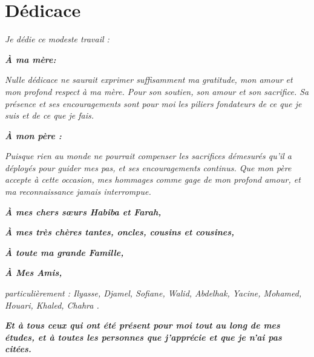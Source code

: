  \chapter*{Dédicace}
\begin{center}
	\textit{  Je dédie ce modeste travail :}
\end{center}
  \begin{center}
  	\textit{\textbf{ À ma mère:} }
  \end{center}
 \begin{center}
 	\textit{ Nulle dédicace ne saurait exprimer suffisamment ma gratitude, mon amour et mon profond respect à ma mère. Pour son soutien, son amour et son sacrifice. Sa présence et ses encouragements sont pour moi les piliers fondateurs de ce que je suis et de ce que je fais.}
 \end{center}
  \begin{center}
  	\textit{\textbf{À mon père :} }
  \end{center}
 \begin{center}
 	\textit{  Puisque rien au monde ne pourrait compenser les sacrifices démesurés qu’il a déployés pour guider mes pas, et ses encouragements continus. Que mon père accepte à cette occasion, mes hommages comme gage de mon profond amour, et ma reconnaissance jamais interrompue.}
 \end{center}
 
\begin{center}
	\textit{ \textbf{À mes chers sœurs Habiba et Farah,}}
\end{center}

\begin{center}
	\textit{\textbf{À mes très chères tantes, oncles, cousins et cousines,}}
\end{center}

\begin{center}
	\textit{ \textbf{À toute ma grande Famille,} }
\end{center}


\begin{center}
	\textit{ \textbf{À Mes Amis,} }
\end{center}

\begin{center}
	\textit{particulièrement :    Ilyasse, Djamel, Sofiane, Walid, Abdelhak, Yacine, Mohamed,  Houari, Khaled, Chahra . }
\end{center}

\begin{center}
	\textit{\textbf{Et à tous ceux qui ont été présent pour moi tout au long de mes études, et à toutes les personnes que j’apprécie et que je n’ai pas citées.}}
\end{center}